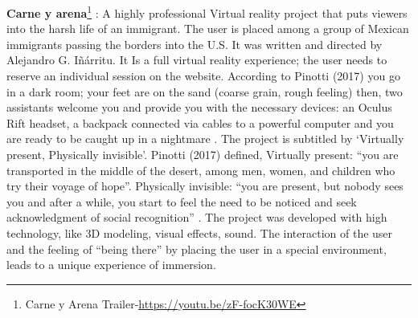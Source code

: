 \textbf{Carne y arena}\footnote{Carne y Arena Trailer-\url{https://youtu.be/zF-focK30WE}} : A highly professional
Virtual reality project that puts viewers
into the harsh life of an immigrant. The
user is placed among a group of
Mexican immigrants passing the
borders into the U.S. It was written and
directed by Alejandro G. Iñárritu. It Is a
full virtual reality experience; the user
needs to reserve an individual session
on the website. According to Pinotti (2017) you go in a dark room; your feet are on the sand (coarse grain, rough feeling) then, two assistants welcome you and provide you with the
necessary devices: an Oculus Rift headset, a backpack connected via cables to a powerful
computer and you are ready to be caught up in a nightmare \citep{Pinotti2017}. The project is
subtitled by ‘Virtually present, Physically invisible’. Pinotti (2017) defined, Virtually present:
“you are transported in the middle of the desert, among men, women, and children who try
their voyage of hope”. Physically invisible: “you are present, but nobody sees you and after a
while, you start to feel the need to be noticed and seek acknowledgment of social
recognition” \citep{Pinotti2017}. The project was developed with high technology, like 3D
modeling, visual effects, sound. The interaction of the user and the feeling of “being there”
by placing the user in a special environment, leads to a unique experience of immersion.

